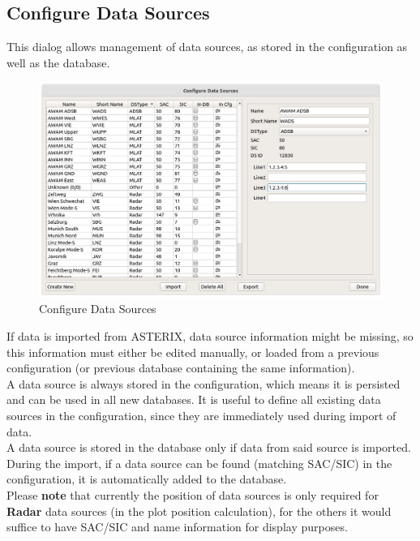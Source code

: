 \subsection{Configure Data Sources}
\label{sec:ui_configure_data_sources}

This dialog allows management of data sources, as stored in the configuration as well as the database. \\

\begin{figure}[H]
  \center
    \includegraphics[width=16cm]{figures/configure_data_sources.png}
  \caption{Configure Data Sources}
\end{figure}

If data is imported from ASTERIX, data source information might be missing, so this information must either be edited manually, or loaded from a previous configuration (or previous database containing the same information). \\

A data source is always stored in the configuration, which means it is persisted and can be used in all new databases. It is useful to define all existing data sources in the configuration, since they are immediately used during import of data. \\

A data source is stored in the database only if data from said source is imported. During the import, if a data source can be found (matching SAC/SIC) in the configuration, it is automatically added to the database. \\

Please \textbf{note} that currently the position of data sources is only required for \textbf{Radar} data sources (in the plot position calculation), for the others it would suffice to have SAC/SIC and name information for display purposes.

